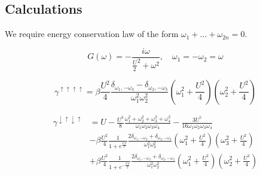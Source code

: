 \subsection{Calculations}

We require energy conservation law of the form $\omega_1+\dots+\omega_{2n}=0$.

\begin{equation} G(\omega) = -\frac{i\omega}{\frac{U}{2}^2+\omega^2},\quad \omega_1=-\omega_2=\omega \end{equation}

\begin{equation} \gamma^{\uparrow\uparrow\uparrow\uparrow} = \beta \frac{U^2}{4}\frac{\delta_{\omega_1,-\omega_3}-\delta_{\omega_2,-\omega_3}}{\omega_1^2\omega_2^2}
  (\omega_1^2+\frac{U^2}{4})(\omega_2^2+\frac{U^2}{4}) 
\end{equation}


\begin{equation}\begin{aligned}
 \gamma^{\downarrow\uparrow\downarrow\uparrow} & = 
 U - \frac{U^3}{8}\frac{\omega_1^2+\omega_2^2+\omega_3^2+\omega_4^2}{\omega_1\omega_2\omega_3\omega_4}
   - \frac{3U^5}{16\omega_1\omega_2\omega_3\omega_4} \\
  &- \beta\frac{U^2}{4}\frac{1}{1+e^{\frac{U\beta}{2}}}\frac{2\delta_{\omega_1,-\omega_2}+\delta_{\omega_2,-\omega_3}}{\omega_1^2\omega_3^2}(\omega_1^2+\frac{U^2}{4})(\omega_3^2+\frac{U^2}{4}) \\
  &+ \beta\frac{U^2}{4}\frac{1}{1+e^{-\frac{U\beta}{2}}}\frac{2\delta_{\omega_1,-\omega_3}+\delta_{\omega_2,-\omega_3}}{\omega_1^2\omega_2^2}(\omega_1^2+\frac{U^2}{4})(\omega_2^2+\frac{U^2}{4})   
\end{aligned}\end{equation}


